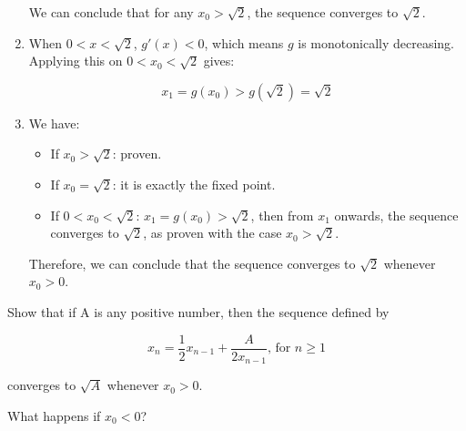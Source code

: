 \documentclass[../../../../Assignments]{subfiles}
\begin{document}
\begin{solution}
\begin{enumerate}[label = \alph*)]
            We can conclude that for any \(x_0 > \sqrt{2}\), the sequence
            converges to \(\sqrt{2}\).

        \item When \(0 < x < \sqrt{2}\), \(g'(x) < 0\), which means \(g\) is
            monotonically decreasing. Applying this on \(0 < x_0 < \sqrt{2}\)
            gives:

            \[x_1 = g(x_0) > g(\sqrt{2}) = \sqrt{2}\]

        \item We have:

            \begin{itemize}
                \item If \(x_0 > \sqrt{2}\): proven.
                \item If \(x_0 = \sqrt{2}\): it is exactly the fixed point.
                \item If \(0 < x_0 < \sqrt{2}\): \(x_1 = g(x_0) > \sqrt{2}\),
                    then from \(x_1\) onwards, the sequence converges to
                    \(\sqrt{2}\), as proven with the case \(x_0 > \sqrt{2}\).
            \end{itemize}

            Therefore, we can conclude that the sequence converges to
            \(\sqrt{2}\) whenever \(x_0 > 0\).
    \end{enumerate}
\end{solution}

\begin{exercise}
    \begin{tasks}
        \task Show that if A is any positive number, then the sequence defined
            by

            \[x_n = \frac{1}{2} x_{n - 1} + \frac{A}{2x_{n - 1}} \text{, for } n \geq 1\]

            converges to \(\sqrt{A}\) whenever \(x_0 > 0\).

        \task What happens if \(x_0 < 0\)?
    \end{tasks}
\end{exercise}
\end{document}
